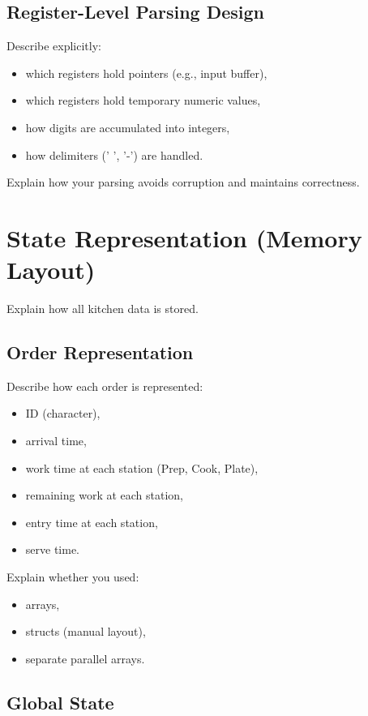 \documentclass[a4paper,12pt]{article}
\begin{document}
\subsection{Register-Level Parsing Design}

Describe explicitly:

\begin{itemize}
\item which registers hold pointers (e.g., input buffer),
\item which registers hold temporary numeric values,
\item how digits are accumulated into integers,
\item how delimiters (' ', '-') are handled.
\end{itemize}

Explain how your parsing avoids corruption and maintains correctness.

\section{State Representation (Memory Layout)}

Explain how all kitchen data is stored.

\subsection{Order Representation}

Describe how each order is represented:

\begin{itemize}
\item ID (character),
\item arrival time,
\item work time at each station (Prep, Cook, Plate),
\item remaining work at each station,
\item entry time at each station,
\item serve time.
\end{itemize}

Explain whether you used:
\begin{itemize}
\item arrays,
\item structs (manual layout),
\item separate parallel arrays.
\end{itemize}

\subsection{Global State}
\end{document}
